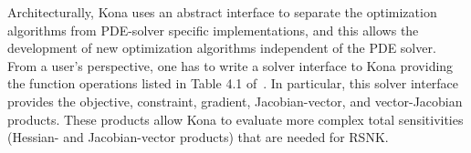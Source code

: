 Architecturally, Kona uses an abstract interface to separate the optimization algorithms from PDE-solver specific implementations, and this allows the development of new optimization algorithms independent of the PDE solver. 
 From a user's perspective, one has to write a solver interface to Kona providing 
the function operations listed in Table 4.1 of~\cite{dener_thesis_2017}. In particular, this solver interface 
provides the objective, constraint, gradient, Jacobian-vector, and vector-Jacobian products.
These products allow Kona to evaluate more complex total sensitivities (\eg Hessian- and Jacobian-vector products)
that are needed for RSNK.






